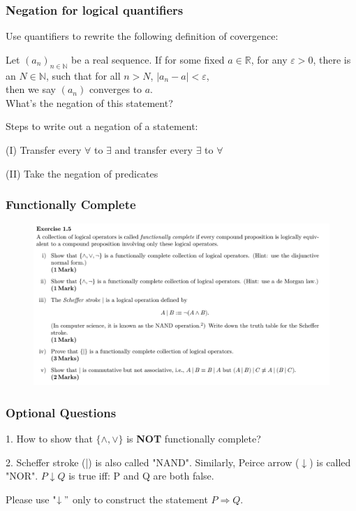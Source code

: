 \documentclass{beamer}
\begin{document}
\begin{frame}
    \frametitle{Negation for logical quantifiers}
    Use quantifiers to rewrite the following definition of covergence:
    \par \vspace{2em} \hspace{1em} Let $(a_n)_{n\in \mathbb{N}}$ be a real sequence. If for some fixed $a \in \mathbb{R}$,
    for any $\varepsilon>0$, there is an $N\in \mathbb{N}$, such that for all $n>N$, $|a_n-a|<\varepsilon$,\\ then we
    say $(a_n)$ converges to $a$.\\
    \vspace{1.5em}
    What's the negation of this statement?

    \vspace{1.5em}
    Steps to write out a negation of a statement:

    (I) Transfer every $\forall$ to $\exists$ and transfer every $\exists$ to $\forall$

    (II) Take the negation of predicates
\end{frame}


\begin{frame}
\end{frame}

\begin{frame}
    \frametitle{Functionally Complete}
    \begin{figure}[htbp]
        \centering
        \includegraphics[width=12cm]{exercise3.png}
    \end{figure}
\end{frame}

\begin{frame}
\end{frame}

\begin{frame}
    \frametitle{Optional Questions}
    1. How to show that $\{\wedge ,\vee\}$ is \textbf{NOT} functionally complete?

    \vspace{1em}
    2. Scheffer stroke (|) is also called "NAND". Similarly, Peirce arrow ($\downarrow$) is called "NOR".
    $P \downarrow Q$ is true iff: P and Q are both false.

    Please use "$\downarrow"$ only to construct the statement $P\Rightarrow Q$.
\end{frame}
\end{document}
